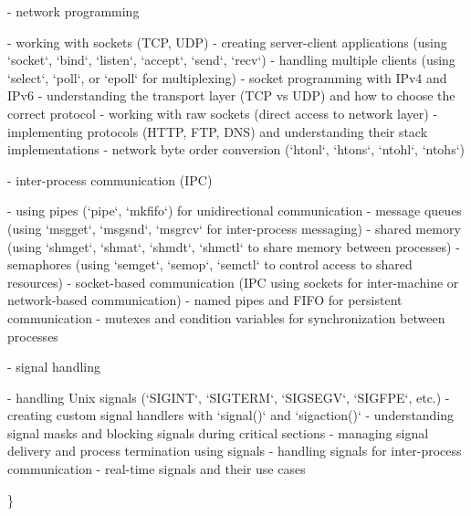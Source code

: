 \begin{DoxyVerb}
{{    }
}

- network programming {

    - working with sockets (TCP, UDP)
    - creating server-client applications (using `socket`, `bind`, `listen`, `accept`, `send`, `recv`)
    - handling multiple clients (using `select`, `poll`, or `epoll` for multiplexing)
    - socket programming with IPv4 and IPv6
    - understanding the transport layer (TCP vs UDP) and how to choose the correct protocol
    - working with raw sockets (direct access to network layer)
    - implementing protocols (HTTP, FTP, DNS) and understanding their stack implementations
    - network byte order conversion (`htonl`, `htons`, `ntohl`, `ntohs`)

}

- inter-process communication (IPC) {

    - using pipes (`pipe`, `mkfifo`) for unidirectional communication
    - message queues (using `msgget`, `msgsnd`, `msgrcv` for inter-process messaging)
    - shared memory (using `shmget`, `shmat`, `shmdt`, `shmctl` to share memory between processes)
    - semaphores (using `semget`, `semop`, `semctl` to control access to shared resources)
    - socket-based communication (IPC using sockets for inter-machine or network-based communication)
    - named pipes and FIFO for persistent communication
    - mutexes and condition variables for synchronization between processes

}

- signal handling {

    - handling Unix signals (`SIGINT`, `SIGTERM`, `SIGSEGV`, `SIGFPE`, etc.)
    - creating custom signal handlers with `signal()` and `sigaction()`
    - understanding signal masks and blocking signals during critical sections
    - managing signal delivery and process termination using signals
    - handling signals for inter-process communication
    - real-time signals and their use cases

}
\end{DoxyVerb}
 \}

